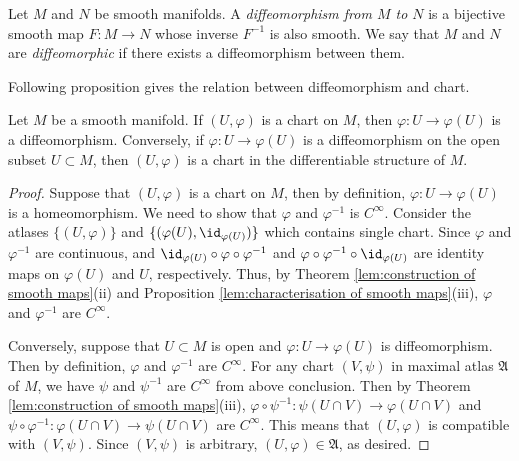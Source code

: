 \begin{definition}[Diffeomorphism]
    Let $M$ and $N$ be smooth manifolds. A \emph{diffeomorphism from $M$ to $N$} is a bijective smooth map $F : M \to N$ whose inverse $F^{-1}$ is also smooth. We say that $M$ and $N$ are \emph{diffeomorphic} if there exists a diffeomorphism between them.
\end{definition}

Following proposition gives the relation between diffeomorphism and chart.

\begin{proposition}\label{lem:chart map is diffeomorphism}
    Let $M$ be a smooth manifold. If $(U, \varphi)$ is a chart on $M$, then $\varphi : U \to \varphi(U)$ is a diffeomorphism. Conversely, if $\varphi : U \to \varphi(U)$ is a diffeomorphism on the open subset $U \subset M$, then $(U, \varphi)$ is a chart in the differentiable structure of $M$.
\end{proposition}

\begin{proof}
    Suppose that $(U, \varphi)$ is a chart on $M$, then by definition, $\varphi : U \to \varphi(U)$ is a homeomorphism. We need to show that $\varphi$ and $\varphi^{-1}$ is $C^\infty$. Consider the atlases $\{(U, \varphi)\}$ and $\{(\varphi(U), \id_{\varphi(U)})\}$ which contains single chart. Since $\varphi$ and $\varphi^{-1}$ are continuous, and $\id_{\varphi(U)} \circ \varphi \circ \varphi^{-1}$ and $\varphi \circ \varphi^{-1} \circ \id_{\varphi(U)}$ are identity maps on $\varphi(U)$ and $U$, respectively. Thus, by Theorem \ref{lem:construction of smooth maps}(ii) and Proposition \ref{lem:characterisation of smooth maps}(iii), $\varphi$ and $\varphi^{-1}$ are $C^\infty$.

    Conversely, suppose that $U \subset M$ is open and $\varphi : U \to \varphi(U)$ is diffeomorphism. Then by definition, $\varphi$ and $\varphi^{-1}$ are $C^\infty$. For any chart $(V, \psi)$ in maximal atlas $\mathfrak{A}$ of $M$, we have $\psi$ and $\psi^{-1}$ are $C^\infty$ from above conclusion. Then by Theorem \ref{lem:construction of smooth maps}(iii), $\varphi \circ \psi^{-1} : \psi(U \cap V) \to \varphi(U \cap V)$ and $\psi \circ \varphi^{-1} : \varphi(U \cap V) \to \psi(U \cap V)$ are $C^\infty$. This means that $(U, \varphi)$ is compatible with $(V, \psi)$. Since $(V, \psi)$ is arbitrary, $(U, \varphi) \in \mathfrak{A}$, as desired.
\end{proof}
